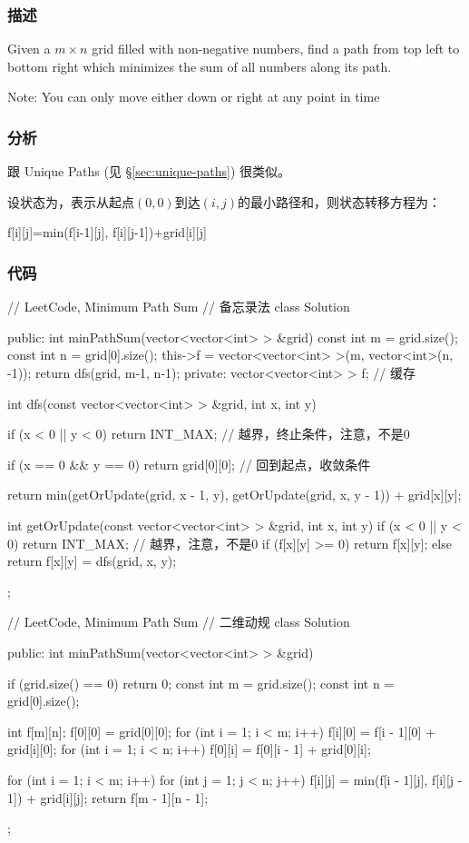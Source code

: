 \subsubsection{描述}
Given a $m \times n$ grid filled with non-negative numbers, find a path from top left to bottom right which minimizes the sum of all numbers along its path.

Note: You can only move either down or right at any point in time


\subsubsection{分析}
跟 Unique Paths (见 \S \ref{sec:unique-paths}) 很类似。

设状态为，表示从起点$(0,0)$到达$(i,j)$的最小路径和，则状态转移方程为：
\begin{Code}
f[i][j]=min(f[i-1][j], f[i][j-1])+grid[i][j]
\end{Code}


\subsubsection{代码}
\begin{Code}
// LeetCode, Minimum Path Sum
// 备忘录法
class Solution {
public:
    int minPathSum(vector<vector<int> > &grid) {
        const int m = grid.size();
        const int n = grid[0].size();
        this->f = vector<vector<int> >(m, vector<int>(n, -1));
        return dfs(grid, m-1, n-1);
    }
private:
    vector<vector<int> > f;  // 缓存

    int dfs(const vector<vector<int> > &grid, int x, int y) {
        if (x < 0 || y < 0) return INT_MAX; // 越界，终止条件，注意，不是0

        if (x == 0 && y == 0) return grid[0][0]; // 回到起点，收敛条件

        return min(getOrUpdate(grid, x - 1, y),
                getOrUpdate(grid, x, y - 1)) + grid[x][y];
    }

    int getOrUpdate(const vector<vector<int> > &grid, int x, int y) {
        if (x < 0 || y < 0) return INT_MAX; // 越界，注意，不是0
        if (f[x][y] >= 0) return f[x][y];
        else return f[x][y] = dfs(grid, x, y);
    }
};
\end{Code}

\begin{Code}
// LeetCode, Minimum Path Sum
// 二维动规
class Solution {
public:
    int minPathSum(vector<vector<int> > &grid) {
        if (grid.size() == 0) return 0;
        const int m = grid.size();
        const int n = grid[0].size();

        int f[m][n];
        f[0][0] = grid[0][0];
        for (int i = 1; i < m; i++) {
            f[i][0] = f[i - 1][0] + grid[i][0];
        }
        for (int i = 1; i < n; i++) {
            f[0][i] = f[0][i - 1] + grid[0][i];
        }

        for (int i = 1; i < m; i++) {
            for (int j = 1; j < n; j++) {
                f[i][j] = min(f[i - 1][j], f[i][j - 1]) + grid[i][j];
            }
        }
        return f[m - 1][n - 1];
    }
};
\end{Code}

